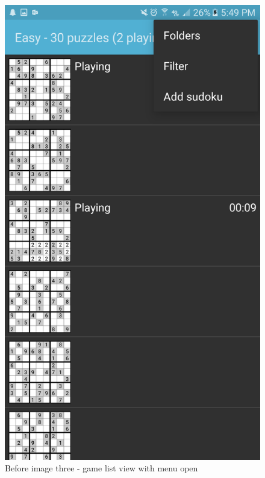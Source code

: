 \documentclass[10pt]{article}
\begin{document}
\begin{figure}
\includegraphics[width=\linewidth]{img/before3.png}
\caption{Before image three - game list view with menu open}
\end{figure}
\end{document}
